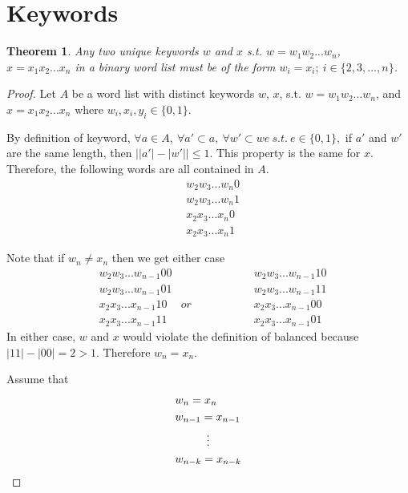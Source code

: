 \documentclass{article}
\newtheorem{theorem}{Theorem}[section]
\begin{document}
    
\section{Keywords}

\begin{theorem}\label{mostlyEqual}
    Any two unique keywords $w$ and $x$ s.t. $w = w_1w_2...w_{n}$, \\ $x = x_1x_2...x_{n}$ in a binary word list must be of the form $w_i = x_i;\ i \in \{2,3,...,n\}$.
\end{theorem}
\begin{proof}
Let $A$ be a word list with distinct keywords $w$, $x$, s.t. $w = w_1w_2...w_{n}$, and $x = x_1x_2...x_{n}$ where $w_i,x_i,y_i \in \{0, 1\}$. 

By definition of keyword, $\forall a \in A,\ \forall a' \subset a,\ \forall w' \subset we\ s.t.\ e \in \{0,1\},$ if $a'$ and $w'$ are the same length, then $\Big||a'| - |w'| \Big| \le 1$. This property is the same for $x$. Therefore, the following words are all contained in $A$.
\begin{align*}
    &w_2w_3...w_{n}0   \\
    &w_2w_3...w_{n}1   \\ 
    &x_2x_3...x_{n}0   \\ 
    &x_2x_3...x_{n}1   
\end{align*}

Note that if $w_{n} \neq x_{n}$ then we get either case 
\begin{align*}
    &w_2w_3...w_{n-1}00 &               & w_2w_3...w_{n-1}10  \\
    &w_2w_3...w_{n-1}01 &               & w_2w_3...w_{n-1}11  \\
    &x_2x_3...x_{n-1}10 &or \hspace{2cm}& x_2x_3...x_{n-1}00  \\
    &x_2x_3...x_{n-1}11 &               & x_2x_3...x_{n-1}01 
\end{align*}
In either case, $w$ and $x$ would violate the definition of balanced because \\ $|11|-|00| = 2 > 1$. Therefore $w_{n} = x_{n}$.

Assume that 
\begin{align*}
    & w_{n} = x_{n} \\
    & w_{n-1} = x_{n-1} \\
    & \vdotswithin{w_{n-k} = x_{n-k}} \\
    &w_{n-k} = x_{n-k}
\end{align*}


\end{proof}
\end{document}
